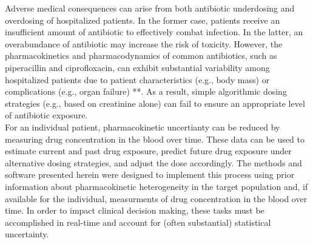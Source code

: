 \documentclass{article}\usepackage[]{graphicx}\usepackage[]{color}
\begin{document}


Adverse medical consequences can arise from both antibiotic underdosing and overdosing of hospitalized patients. In the former case, patients receive an insufficient amount of antibiotic to effectively combat infection. In the latter, an overabundance of antibiotic may increase the risk of toxicity. However, the pharmacokinetics and pharmacodynamics of common antibiotics, such as piperacillin and ciprofloxacin, can exhibit substantial variability among hospitalized patients due to patient characteristics (e.g., body mass) or complications (e.g., organ failure) **. As a result, simple algorithmic dosing strategies (e.g., based on creatinine alone) can fail to ensure an appropriate level of antibiotic exposure.\\

For an individual patient, pharmacokinetic uncertianty can be reduced by measuring drug concentration in the blood over time. These data can be used to estimate current and past drug exposure, predict future drug exposure under alternative dosing strategies, and adjust the dose accordingly. The methods and software presented herein were designed to implement this process using prior information about pharmacokinetic heterogeneity in the target population and, if available for the individual, measurments of drug concentration in the blood over time. In order to impact clinical decision making, these tasks must be accomplished in real-time and account for (often substantial) statistical uncertainty.\\
\end{document}
